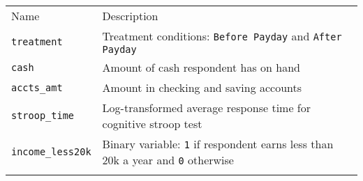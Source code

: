 \documentclass[]{article}
\begin{document}
\begin{longtable}[c]{@{}ll@{}}
\toprule\addlinespace
\begin{minipage}[b]{0.31\columnwidth}\raggedright
Name
\end{minipage} & \begin{minipage}[b]{0.62\columnwidth}\raggedright
Description
\end{minipage}
\\\addlinespace
\midrule\endhead
\begin{minipage}[t]{0.31\columnwidth}\raggedright
\texttt{treatment}
\end{minipage} & \begin{minipage}[t]{0.62\columnwidth}\raggedright
Treatment conditions: \texttt{Before Payday} and \texttt{After Payday}
\end{minipage}
\\\addlinespace
\begin{minipage}[t]{0.31\columnwidth}\raggedright
\texttt{cash}
\end{minipage} & \begin{minipage}[t]{0.62\columnwidth}\raggedright
Amount of cash respondent has on hand
\end{minipage}
\\\addlinespace
\begin{minipage}[t]{0.31\columnwidth}\raggedright
\texttt{accts\_amt}
\end{minipage} & \begin{minipage}[t]{0.62\columnwidth}\raggedright
Amount in checking and saving accounts
\end{minipage}
\\\addlinespace
\begin{minipage}[t]{0.31\columnwidth}\raggedright
\texttt{stroop\_time}
\end{minipage} & \begin{minipage}[t]{0.62\columnwidth}\raggedright
Log-transformed average response time for cognitive stroop test
\end{minipage}
\\\addlinespace
\begin{minipage}[t]{0.31\columnwidth}\raggedright
\texttt{income\_less20k}
\end{minipage} & \begin{minipage}[t]{0.62\columnwidth}\raggedright
Binary variable: \texttt{1} if respondent earns less than 20k a year and
\texttt{0} otherwise
\end{minipage}
\\\addlinespace
\bottomrule
\end{longtable}
\end{document}
